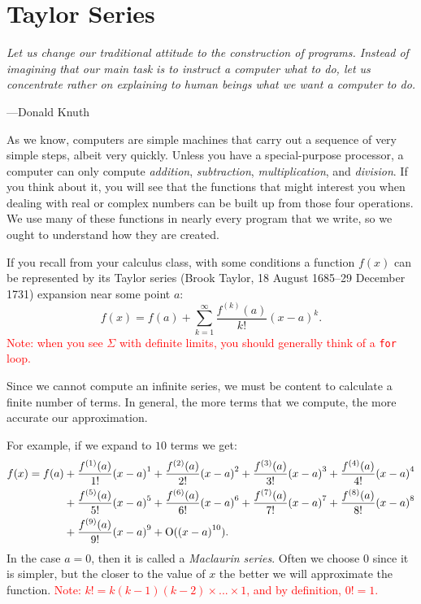 \section{Taylor Series}

\textwidth
\epigraph{\emph{Let us change our traditional attitude to the construction of
programs. Instead of imagining that our main task is to instruct a computer what
to do, let us concentrate rather on explaining to human beings what we want a
computer to do.}} {---Donald Knuth}

\noindent As we know, computers are simple machines that carry out a sequence of
very simple steps, albeit very quickly. Unless you have a special-purpose
processor, a computer can only compute \emph{addition}, \emph{subtraction},
\emph{multiplication}, and \emph{division}. If you think about it, you will see
that the functions that might interest you when dealing with real or complex
numbers can be built up from those four operations.  We use many of these
functions in nearly every program that we write, so we ought to understand how
they are created.

If you recall from your calculus class, with some conditions a function $f(x)$
can be represented by its Taylor series (Brook Taylor, 18 August 1685--29 December 1731)
expansion near some point $a$:
\[
  f(x) = f(a) + \sum_{k=1}^\infty \frac{f^{(k)}(a)}{k!}{(x-a)}^k.
\]
\textcolor{red}{Note: when you see $\Sigma$ with definite limits, you should generally think of a
\texttt{for} loop.}

Since we cannot compute an infinite series, we must be content to calculate a
finite number of terms. In general, the more terms that we compute, the more
accurate our approximation.

For example, if we expand to $10$ terms we get:
\begin{align*}
  f(x) = f(a) &+ \frac{f^{(1)} (a)}{1!}{(x-a)}^{1} + \frac{f^{(2)} (a)}{2!}{(x-a)}^{2} + \frac{f^{(3)} (a)}{3!}{(x-a)}^{3} + \frac{f^{(4)} (a)}{4!}{(x-a)}^{4} \\
              &+ \frac{f^{(5)} (a)}{5!}{(x-a)}^{5} + \frac{f^{(6)} (a)}{6!}{(x-a)}^{6} + \frac{f^{(7)} (a)}{7!}{(x-a)}^{7} + \frac{f^{(8)} (a)}{8!}{(x-a)}^{8} \\
              &+ \frac{f^{(9)} (a)}{9!}{(x-a)}^{9} + \operatorname{O}({(x-a)}^{10}). \\
\end{align*}
In the case $a =0$, then it is called a \emph{Maclaurin series}.  Often we
choose $0$ since it is simpler, but the closer to the value of $x$ the better we
will approximate the function. \textcolor{red}{Note: $k! =
k(k-1)(k-2)\times...\times1$, and by definition, $0! = 1$. }

